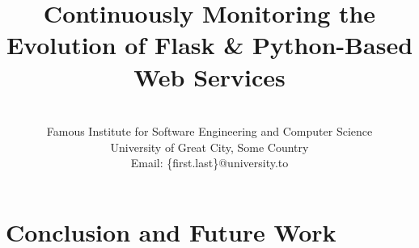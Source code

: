 \documentclass[conference]{IEEEtran}
\begin{document}
	

\title{Continuously Monitoring the Evolution of Flask \& Python-Based Web Services}

\author{
\\
Famous Institute for Software Engineering and Computer Science\\
University of Great City, Some Country\\
Email: \{first.last\}@university.to 
}


\maketitle



















% 






\section{Conclusion and Future Work}
\label{sec:conclusions}
\end{document}
